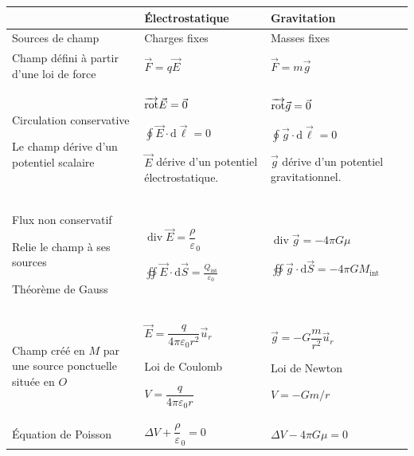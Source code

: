 \documentclass[11pt,a4paper]{article}
\newcommand{\dd}{\mathrm d}
\newcommand{\divg}{\operatorname{div}}\newcommand{\sy}{\operatorname{sym}}
\newcommand{\ur}{\vec u_r}\newcommand{\ut}{\vec u_\theta}\newcommand{\uphi}{\vec u_\varphi}
\newcommand{\eps}{\varepsilon_0}\newcommand{\E}{\vec E}\newcommand{\dS}{\dd\vec S}\newcommand{\dM}{\dd\vec M}
\begin{document}
\begin{tabularx}{\linewidth}{|>{\raggedright\arraybackslash}p{.27\linewidth}|>{\centering\arraybackslash}X|>{\centering\arraybackslash}X|}\hline
&\textbf{Électrostatique}&\textbf{Gravitation}\\\hline
Sources de champ&Charges fixes&Masses fixes\\\hline
Champ défini à partir d'une loi de force&$\vec F=q\E$&$\vec F=m\vec g$\\\hline
Circulation conservative\par\vspace{4pt} Le champ dérive d'un potentiel scalaire&$\rot\E=\vec0$\par\vspace{4pt} $\displaystyle\oint\E\cdot\dd\vec\ell=0$\par\vspace{4pt} $\E$ dérive d'un potentiel électrostatique.&$\overrightarrow{\mathrm{rot}}\vec g=\vec0$\par\vspace{4pt} $\displaystyle\oint\vec g\cdot\dd\vec\ell=0$\par\vspace{4pt} $\vec g$ dérive d'un potentiel gravitationnel.\\\hline
Flux non conservatif\par\vspace{4pt} Relie le champ à ses sources\par\vspace{4pt} Théorème de Gauss&$\divg\E=\dfrac\rho\eps$\par\vspace{4pt} $\displaystyle\oiint\E\cdot\dS=\frac{Q_{\mathrm{int}}}{\eps}$&$\divg\vec g=-4\pi G\mu$\par\vspace{4pt} $\displaystyle\oiint\vec g\cdot\dS=-4\pi GM_{\mathrm{int}}$\\\hline
Champ créé en $M$ par une source ponctuelle située en $O$&$\E=\dfrac{q}{4\pi\eps r^2}\ur$\par\vspace{4pt} Loi de Coulomb\par\vspace{4pt} $V=\dfrac q{4\pi\eps r}$&$\vec g=-G\dfrac m{r^2}\ur$\par\vspace{4pt} Loi de Newton\par\vspace{4pt} $V=-Gm/r$\\\hline
Équation de Poisson&$\Delta V+\dfrac\rho\eps=0$&$\Delta V-4\pi G\mu=0$\\\hline
\end{tabularx}\endgroup
\end{document}
